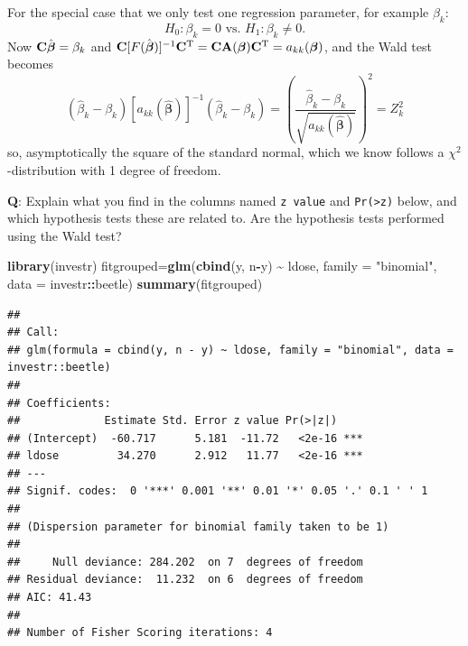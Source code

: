 \documentclass[
  ignorenonframetext,
]{beamer}
\newenvironment{Shaded}{\begin{snugshade}}{\end{snugshade}}
\newcommand{\AttributeTok}[1]{\textcolor[rgb]{0.13,0.29,0.53}{#1}}
\newcommand{\FunctionTok}[1]{\textcolor[rgb]{0.13,0.29,0.53}{\textbf{#1}}}
\newcommand{\NormalTok}[1]{#1}
\newcommand{\OtherTok}[1]{\textcolor[rgb]{0.56,0.35,0.01}{#1}}
\newcommand{\SpecialCharTok}[1]{\textcolor[rgb]{0.81,0.36,0.00}{\textbf{#1}}}
\newcommand{\StringTok}[1]{\textcolor[rgb]{0.31,0.60,0.02}{#1}}
\begin{document}
\begin{frame}[fragile]
For the special case that we only test one regression parameter, for
example \(\beta_k\):
\[ H_0: \beta_k=0 \text{ vs. } H_1: \beta_k\neq 0.\] Now
\({\bf C}\hat{\boldsymbol{\beta}}=\beta_k\) and
\({\bf C}[F(\hat{\boldsymbol{\beta}})]^{-1}{\bf C}^{\text T}={\bf C}{\bf A}(\boldsymbol{\beta}){\bf C}^{\text T}=a_{kk}(\boldsymbol{\beta})\),
and the Wald test becomes
\[ (\hat{\beta}_k-\beta_k)[a_{kk}(\hat{\boldsymbol{\beta}})]^{-1}(\hat{\beta}_k-\beta_k)=\left(\frac{\hat{\beta}_k-\beta_k}{\sqrt{a_{kk}(\hat{\boldsymbol{\beta}})}}\right)^2=Z_k^2\]
so, asymptotically the square of the standard normal, which we know
follows a \(\chi^2\)-distribution with 1 degree of freedom.

\textbf{Q}: Explain what you find in the columns named \texttt{z\ value}
and \texttt{Pr(\textgreater{}\textbar{}z\textbar{})} below, and which
hypothesis tests these are related to. Are the hypothesis tests
performed using the Wald test?
\end{frame}

\begin{frame}[fragile]
\begin{Shaded}
\begin{Highlighting}[]
\FunctionTok{library}\NormalTok{(investr)}
\NormalTok{fitgrouped}\OtherTok{=}\FunctionTok{glm}\NormalTok{(}\FunctionTok{cbind}\NormalTok{(y, n}\SpecialCharTok{{-}}\NormalTok{y) }\SpecialCharTok{\textasciitilde{}}\NormalTok{ ldose, }\AttributeTok{family =} \StringTok{"binomial"}\NormalTok{, }\AttributeTok{data =}\NormalTok{ investr}\SpecialCharTok{::}\NormalTok{beetle) }
\FunctionTok{summary}\NormalTok{(fitgrouped)}
\end{Highlighting}
\end{Shaded}

\begin{verbatim}
## 
## Call:
## glm(formula = cbind(y, n - y) ~ ldose, family = "binomial", data = investr::beetle)
## 
## Coefficients:
##             Estimate Std. Error z value Pr(>|z|)    
## (Intercept)  -60.717      5.181  -11.72   <2e-16 ***
## ldose         34.270      2.912   11.77   <2e-16 ***
## ---
## Signif. codes:  0 '***' 0.001 '**' 0.01 '*' 0.05 '.' 0.1 ' ' 1
## 
## (Dispersion parameter for binomial family taken to be 1)
## 
##     Null deviance: 284.202  on 7  degrees of freedom
## Residual deviance:  11.232  on 6  degrees of freedom
## AIC: 41.43
## 
## Number of Fisher Scoring iterations: 4
\end{verbatim}
\end{frame}
\end{document}
